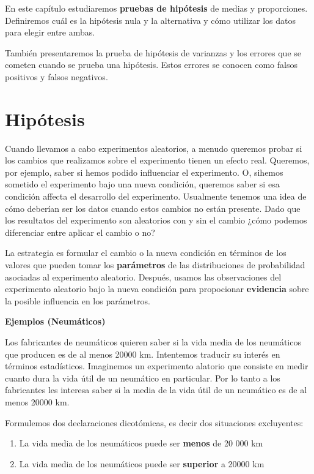 \documentclass[
]{book}
\providecommand{\tightlist}{%
  \setlength{\itemsep}{0pt}\setlength{\parskip}{0pt}}
\begin{document}
En este capítulo estudiaremos \textbf{pruebas de hipótesis} de medias y proporciones. Definiremos cuál es la hipótesis nula y la alternativa y cómo utilizar los datos para elegir entre ambas.

También presentaremos la prueba de hipótesis de varianzas y los errores que se cometen cuando se prueba una hipótesis. Estos errores se conocen como falsos positivos y falsos negativos.

\hypertarget{hipuxf3tesis}{%
\section{Hipótesis}\label{hipuxf3tesis}}

Cuando llevamos a cabo experimentos aleatorios, a menudo queremos probar si los cambios que realizamos sobre el experimento tienen un efecto real. Queremos, por ejemplo, saber si hemos podido influenciar el experimento. O, sihemos sometido el experimento bajo una nueva condición, queremos saber si esa condición affecta el desarrollo del experimento. Usualmente tenemos una idea de cómo deberían ser los datos cuando estos cambios no están presente. Dado que los resultatos del experimento son aleatorios con y sin el cambio ¿cómo podemos diferenciar entre aplicar el cambio o no?

La estrategia es formular el cambio o la nueva condición en términos de los valores que pueden tomar los \textbf{parámetros} de las distribuciones de probabilidad asociadas al experimento aleatorio. Después, usamos las observaciones del experimento aleatorio bajo la nueva condición para propocionar \textbf{evidencia} sobre la posible influencia en los parámetros.

\textbf{Ejemplos (Neumáticos)}

Los fabricantes de neumáticos quieren saber si la vida media de los neumáticos que producen es de al menos 20000 km. Intentemos traducir su interés en términos estadísticos. Imaginemos un experimento alatorio que consiste en medir cuanto dura la vida útil de un neumático en particular. Por lo tanto a los fabricantes les interesa saber si la media de la vida útil de un neumático es de al menos 20000 km.

\newpage

Formulemos dos declaraciones dicotómicas, es decir dos situaciones excluyentes:

\begin{enumerate}
\def\labelenumi{\alph{enumi}.}
\tightlist
\item
  La vida media de los neumáticos puede ser \textbf{menos} de 20 000 km
\item
  La vida media de los neumáticos puede ser \textbf{superior} a 20000 km
\end{enumerate}
\end{document}
